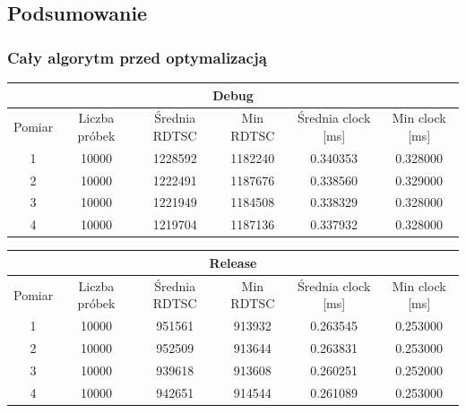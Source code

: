 \documentclass{article}
\begin{document}
	\pagebreak
	\subsection{Podsumowanie}
	\subsubsection{Cały algorytm przed optymalizacją}
	\begin{center}
		\begin{tabular}{|c|c|c|c|c|c|} \hline
			\multicolumn{6}{|c|}{Debug} \\\hline
			Pomiar  & Liczba próbek & Średnia RDTSC & Min RDTSC & Średnia clock [ms] & Min clock [ms] \\\hline
			\hline
			1 & 10000 & 1228592 & 1182240 & 0.340353 & 0.328000 \\\hline
			2 & 10000 & 1222491 & 1187676 & 0.338560 & 0.329000 \\\hline
			3 & 10000 & 1221949 & 1184508 & 0.338329 & 0.328000 \\\hline
			4 & 10000 & 1219704 & 1187136 & 0.337932 & 0.328000 \\\hline
			
		\end{tabular}
	\end{center}
	\begin{center}
		\begin{tabular}{|c|c|c|c|c|c|} \hline
			\multicolumn{6}{|c|}{Release} \\\hline
			Pomiar  & Liczba próbek & Średnia RDTSC & Min RDTSC & Średnia clock [ms] & Min clock [ms] \\\hline
			\hline
			1 & 10000 & 951561 & 913932 & 0.263545 & 0.253000 \\\hline
			2 & 10000 & 952509 & 913644 & 0.263831 & 0.253000 \\\hline
			3 & 10000 & 939618 & 913608 & 0.260251 & 0.252000 \\\hline
			4 & 10000 & 942651 & 914544 & 0.261089 & 0.253000 \\\hline
			
		\end{tabular}
	\end{center}
	
\end{document}
